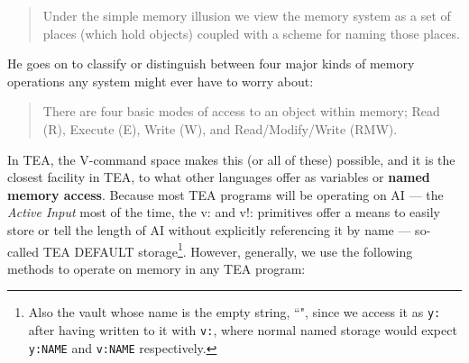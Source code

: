 \documentclass[a4paper, 18pt]{book} %
\begin{document}
{{{\begin{minipage}{1\textwidth}
\vspace{1em}
\begin{quotation}
{\ttfamily

Under the simple memory illusion we view the memory system as a set of places (which hold objects) coupled with a scheme for naming those places.

}
\end{quotation}
\vspace{1em}
\end{minipage}


He goes on to classify or distinguish between four major kinds of memory operations any system might ever have to worry about:



\begin{minipage}{1\textwidth}
\vspace{1em}
\begin{quotation}
{\ttfamily

There are four basic modes of access to an object within memory; Read (R), Execute (E), Write (W), and Read/Modify/Write (RMW).

}
\end{quotation}
\vspace{1em}
\end{minipage}


In TEA, the V-command space makes this (or all of these) possible, and it is the closest facility in TEA, to what other languages offer as variables or \textbf{named memory access}. Because most TEA programs will be operating on AI --- the \textit{Active Input} most of the time, the v: and v!: primitives offer a means to easily store or tell the length of AI without explicitly referencing it by name --- so-called TEA DEFAULT storage\footnote{Also the vault whose name is the empty string, ``", since we access it as \texttt{y:} after having written to it with \texttt{v:}, where normal named storage would expect \texttt{y:NAME} and \texttt{v:NAME} respectively.}. However, generally, we use the following methods to operate on memory in any TEA program:

}}}
\end{document}
